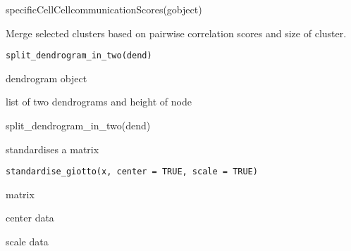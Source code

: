 \documentclass[a4paper]{book}
\begin{document}
%
\begin{Examples}
\begin{ExampleCode}
    specificCellCellcommunicationScores(gobject)
\end{ExampleCode}
\end{Examples}
%
\begin{Description}\relax
Merge selected clusters based on pairwise correlation scores and size of cluster.
\end{Description}
%
\begin{Usage}
\begin{verbatim}
split_dendrogram_in_two(dend)
\end{verbatim}
\end{Usage}
%
\begin{Arguments}
\begin{ldescription}
\item[\code{dend}] dendrogram object
\end{ldescription}
\end{Arguments}
%
\begin{Value}
list of two dendrograms and height of node
\end{Value}
%
\begin{Examples}
\begin{ExampleCode}
    split_dendrogram_in_two(dend)
\end{ExampleCode}
\end{Examples}
%
\begin{Description}\relax
standardises a matrix
\end{Description}
%
\begin{Usage}
\begin{verbatim}
standardise_giotto(x, center = TRUE, scale = TRUE)
\end{verbatim}
\end{Usage}
%
\begin{Arguments}
\begin{ldescription}
\item[\code{x}] matrix

\item[\code{center}] center data

\item[\code{scale}] scale data
\end{ldescription}
\end{Arguments}
\end{document}
